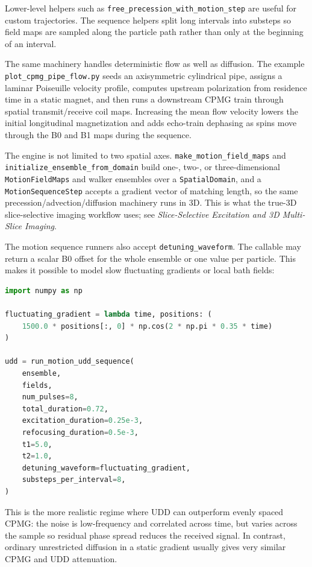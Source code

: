 \documentclass[11pt,oneside]{report}
\newcommand{\code}[1]{\texttt{#1}}
\begin{document}
Lower-level helpers such as \code{free\_precession\_with\_motion\_step} are
useful for custom trajectories. The sequence helpers split long intervals into
substeps so field maps are sampled along the particle path rather than only at
the beginning of an interval.

The same machinery handles deterministic flow as well as diffusion. The example
\code{plot\_cpmg\_pipe\_flow.py} seeds an axisymmetric cylindrical pipe, assigns
a laminar Poiseuille velocity profile, computes upstream polarization from
residence time in a static magnet, and then runs a downstream CPMG train through
spatial transmit/receive coil maps. Increasing the mean flow velocity lowers
the initial longitudinal magnetization and adds echo-train dephasing as spins
move through the B0 and B1 maps during the sequence.

The engine is not limited to two spatial axes. \code{make\_motion\_field\_maps}
and \code{initialize\_ensemble\_from\_domain} build one-, two-, or
three-dimensional \code{MotionFieldMaps} and walker ensembles over a
\code{SpatialDomain}, and a \code{MotionSequenceStep} accepts a gradient vector
of matching length, so the same precession/advection/diffusion machinery runs in
3D. This is what the true-3D slice-selective imaging workflow uses; see
\emph{Slice-Selective Excitation and 3D Multi-Slice Imaging}.

The motion sequence runners also accept \code{detuning\_waveform}. The callable
may return a scalar B0 offset for the whole ensemble or one value per particle.
This makes it possible to model slow fluctuating gradients or local bath fields:

\begin{lstlisting}[language=Python]
import numpy as np

fluctuating_gradient = lambda time, positions: (
    1500.0 * positions[:, 0] * np.cos(2 * np.pi * 0.35 * time)
)

udd = run_motion_udd_sequence(
    ensemble,
    fields,
    num_pulses=8,
    total_duration=0.72,
    excitation_duration=0.25e-3,
    refocusing_duration=0.5e-3,
    t1=5.0,
    t2=1.0,
    detuning_waveform=fluctuating_gradient,
    substeps_per_interval=8,
)
\end{lstlisting}

This is the more realistic regime where UDD can outperform evenly spaced CPMG:
the noise is low-frequency and correlated across time, but varies across the
sample so residual phase spread reduces the received signal. In contrast,
ordinary unrestricted diffusion in a static gradient usually gives very similar
CPMG and UDD attenuation.
\end{document}
